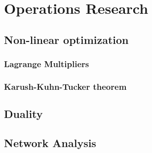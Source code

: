 \section{Operations Research}

\subsection{Non-linear optimization}

\subsubsection{Lagrange Multipliers}

\subsubsection{Karush-Kuhn-Tucker theorem}

\subsection{Duality}


\subsection{Network Analysis}
